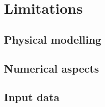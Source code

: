 \section{Limitations}\label{sec:limitations}

\subsection{Physical modelling}
\subsection{Numerical aspects}
\subsection{Input data}

